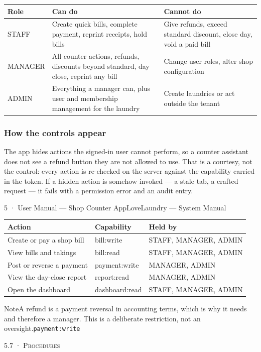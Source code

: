 \documentclass[11pt,a4paper,oneside]{book}
\begin{document}
\begin{center}\small
\begin{tabularx}{\linewidth}{|X|X|X|}
\hline
\rowcolor{lightgrey}
\textbf{Role} & \textbf{Can do} & \textbf{Cannot do} \\ \hline
STAFF & Create quick bills, complete payment, reprint receipts, hold bills & Give refunds, exceed standard discount, close day, void a paid bill \\ \hline
MANAGER & All counter actions, refunds, discounts beyond standard, day close, reprint any bill & Change user roles, alter shop configuration \\ \hline
ADMIN & Everything a manager can, plus user and membership management for the laundry & Create laundries or act outside the tenant \\ \hline
\end{tabularx}
\end{center}
\subsubsection*{How the controls appear}
The app hides actions the signed-in user cannot perform, so a counter assistant does not see a refund button they are not allowed to use. That is a courtesy, not the control: every action is re-checked on the server against the capability carried in the token. If a hidden action is somehow invoked — a stale tab, a crafted request — it fails with a permission error and an audit entry.

5 · User Manual — Shop Counter AppLoveLaundry — System Manual

\begin{center}\small
\begin{tabularx}{\linewidth}{|X|X|X|}
\hline
\rowcolor{lightgrey}
\textbf{Action} & \textbf{Capability} & \textbf{Held by} \\ \hline
Create or pay a shop bill & bill:write & STAFF, MANAGER, ADMIN \\ \hline
View bills and takings & bill:read & STAFF, MANAGER, ADMIN \\ \hline
Post or reverse a payment & payment:write & MANAGER, ADMIN \\ \hline
View the day-close report & report:read & MANAGER, ADMIN \\ \hline
Open the dashboard & dashboard:read & STAFF, MANAGER, ADMIN \\ \hline
\end{tabularx}
\end{center}
\begin{notebox}NoteA refund is a payment reversal in accounting terms, which is why it needs  and therefore a manager. This is a deliberate restriction, not an oversight.\texttt{payment:write}\end{notebox}
\textsc{\small\color{crimson}5.7 · Procedures}\par\medskip
\end{document}
